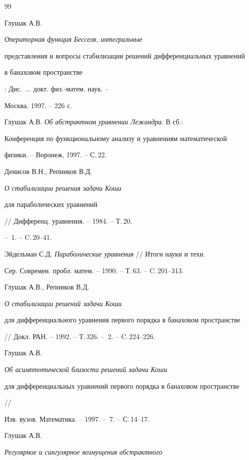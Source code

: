 




\begin{thebibliography}{99}







Глушак А.В. {\it Операторная функция Бесселя, интегральные


представления и вопросы стабилизации решений дифференциальных уравнений


в банаховом пространстве}: Дис.~$\dotsc$ докт. физ.-матем. наук. -- 


Москва, 1997. -- 226 с.




Глушак А.В. {\it Об абстрактном уравнении Лежандра}. В сб.:


Конференция по функциональному анализу и уравнениям математической


физики. -- Воронеж, 1997. -- С.\,22.




Денисов В.Н., Репников В.Д. {\it О стабилизации решения задачи Коши  


для параболических уравнений}// Дифференц. уравнения. -- 1984. -- Т.\,20.


-- \No\,1. -- C.\,20--41.




Эйдельман С.Д. {\it Параболические уравнения} // Итоги науки и техн. 


Сер. Современ. пробл. матем. -- 1990. -- Т.\,63. -- C.\,201--313.




Глушак А.В., Репников В.Д. {\it О стабилизации решений задачи Коши  


для дифференциального уравнения первого порядка в банаховом пространстве}


// Докл. РАН. -- 1992. -- Т.\,326. -- \No\,2. -- C.\,224--226.




Глушак А.В. {\it Об асимптотической близости решений задачи Коши


для дифференциальных уравнений первого порядка в банаховом пространстве} //


Изв. вузов. Математика. -- 1997. -- \No\,7. -- С.\,14--17.




Глушак А.В. {\it Регулярное и сингулярное возмущения абстрактного 


}
\end{thebibliography}
